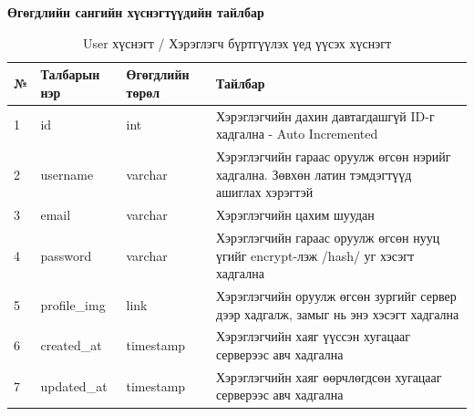 \pagebreak
\textbf{Өгөгдлийн сангийн хүснэгтүүдийн тайлбар}

\begin{table}[h]
	\caption{User хүснэгт / 
	Хэрэглэгч бүртгүүлэх үед үүсэх хүснэгт}
	\begin{tabular}{|l|l|l|p{8cm}|}
		\hline
		№ & Талбарын нэр & Өгөгдлийн төрөл & Тайлбар                                                                                    \\ \hline
		1 & id           & int             & Хэрэглэгчийн дахин давтагдашгүй ID-г хадгална - Auto Incremented                           \\ \hline
		2 & username     & varchar         & Хэрэглэгчийн гараас оруулж өгсөн нэрийг хадгална. Зөвхөн латин тэмдэгтүүд ашиглах хэрэгтэй \\ \hline
		3 & email        & varchar         & Хэрэглэгчийн цахим шуудан                                                                  \\ \hline
		4 & password     & varchar         & Хэрэглэгчийн гараас оруулж өгсөн нууц үгийг encrypt-лэж /hash/ уг хэсэгт хадгална          \\ \hline
		5 & profile\_img & link            & Хэрэглэгчийн оруулж өгсөн зургийг сервер дээр хадгалж, замыг нь энэ хэсэгт хадгална        \\ \hline
		6 & created\_at  & timestamp       & Хэрэглэгчийн хаяг үүссэн хугацааг серверээс авч хадгална                                   \\ \hline
		7 & updated\_at  & timestamp       & Хэрэглэгчийн хаяг өөрчлөгдсөн хугацааг серверээс авч хадгална                               \\ \hline
	\end{tabular}
\end{table}

\clearpage


